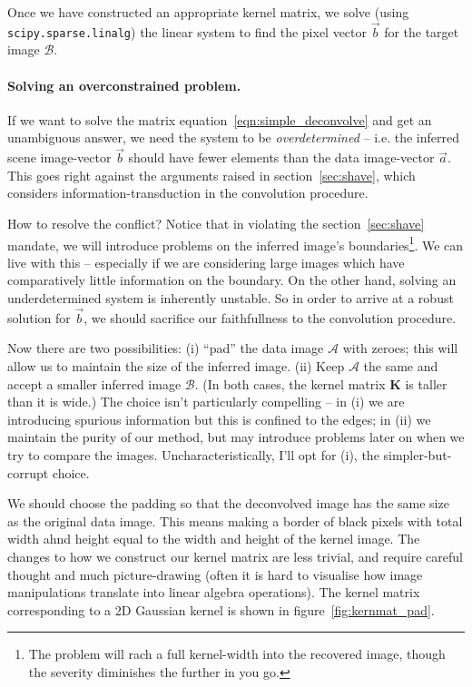 \documentclass[letterpaper, 11pt]{article}
\begin{document}
Once we have constructed an appropriate kernel matrix, we solve (using \texttt{scipy.sparse.linalg}) the linear system to find the pixel vector $\vec b$ for the target image $\mathcal B$.

\paragraph{Solving an overconstrained problem.} If we want to solve the matrix equation~\ref{eqn:simple_deconvolve} and get an unambiguous answer, we need the system to be \emph{overdetermined} -- i.e. the inferred scene image-vector $\vec b$ should have fewer elements than the data image-vector $\vec a$. This goes right against the arguments raised in section~\ref{sec:shave}, which considers information-transduction in the convolution procedure.

How to resolve the conflict? Notice that in violating the section~\ref{sec:shave} mandate, we will introduce problems on the inferred image's boundaries\footnote{The problem will rach a full kernel-width into the recovered image, though the severity diminishes the further in you go.}. We can live with this -- especially if we are considering large images which have comparatively little information on the boundary. On the other hand, solving an underdetermined system is inherently unstable. So in order to arrive at a robust solution for $\vec b$, we should sacrifice our faithfullness to the convolution procedure.

Now there are two possibilities: (i) ``pad'' the data image $\mathcal A$ with zeroes; this will allow us to maintain the size of the inferred image. (ii) Keep $\mathcal A$ the same and accept a smaller inferred image $\mathcal B$. (In both cases, the kernel matrix $\mathbf K$ is taller than it is wide.) The choice isn't particularly compelling -- in (i) we are introducing spurious information but this is confined to the edges; in (ii) we maintain the purity of our method, but may introduce problems later on when we try to compare the images. Uncharacteristically, I'll opt for (i), the simpler-but-corrupt choice.

We should choose the padding so that the deconvolved image has the same size as the original data image. This means making a border of black pixels with total width ahnd height equal to the width and height of the kernel image. The changes to how we construct our kernel matrix are less trivial, and require careful thought and much picture-drawing (often it is hard to visualise how image manipulations translate into linear algebra operations). The kernel matrix corresponding to a 2D Gaussian kernel is shown in figure~\ref{fig:kernmat_pad}.
\end{document}
